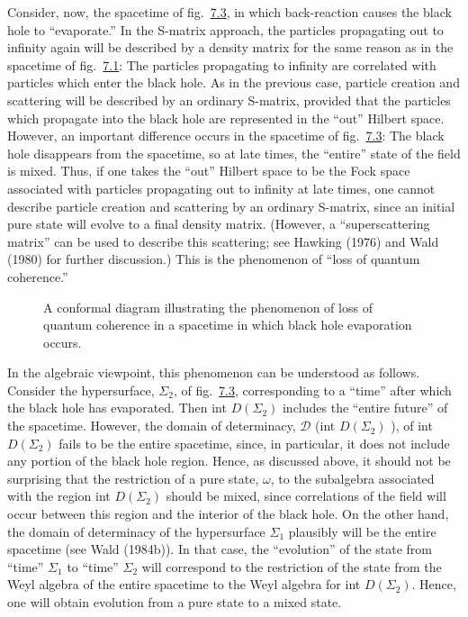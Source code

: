 \documentclass[11pt,a4paper]{article}
\begin{document}
Consider, now, the spacetime of fig.~\hyperref[fig:7.3]{7.3}, in which back-reaction causes the black hole to ``evaporate.'' In the S-matrix approach, the particles propagating out to infinity again will be described by a density matrix for the same reason as in the spacetime of fig.~\hyperref[fig:7.1]{7.1}: The particles propagating to infinity are correlated with particles which enter the black hole. As in the previous case, particle creation and scattering will be described by an ordinary S-matrix, provided that the particles which propagate into the black hole are represented in the ``out'' Hilbert space. However, an important difference occurs in the spacetime of fig.~\hyperref[fig:7.3]{7.3}: The black hole disappears from the spacetime, so at late times, the ``entire'' state of the field is mixed. Thus, if one takes the ``out'' \hypertarget{source-193}{} Hilbert space to be the Fock space associated with particles propagating out to infinity at late times, one cannot describe particle creation and scattering by an ordinary S-matrix, since an initial pure state will evolve to a final density matrix. (However, a ``superscattering matrix'' can be used to describe this scattering; see Hawking (1976) and Wald (1980) for further discussion.) This is the phenomenon of ``loss of quantum coherence.''

\begin{figure}[htbp]
\centering
\renewcommand{\thefigure}{7.3}

\caption{A conformal diagram illustrating the phenomenon of loss of quantum coherence in a spacetime in which black hole evaporation occurs.}\label{fig:7.3}
\end{figure}

In the algebraic viewpoint, this phenomenon can be understood as follows. Consider the hypersurface, \(\Sigma_2\), of fig.~\hyperref[fig:7.3]{7.3}, corresponding to a ``time'' after which the black hole has evaporated. Then int \(D(\Sigma_2)\) includes the ``entire future'' of the spacetime. However, the domain of determinacy, \(\mathcal{D}\) (int \(D(\Sigma_2)\) ), of int \(D(\Sigma_2)\) fails to be the entire spacetime, since, in particular, it does not include any portion of the black hole region. Hence, as discussed above, it should not be surprising that the restriction of a pure state, \(\omega\), to the subalgebra associated with the region int \(D(\Sigma_2)\) should be mixed, since correlations of the field will occur between this region and the interior of the black hole. On the other hand, the domain of determinacy of the hypersurface \(\Sigma_1\) plausibly will be the entire spacetime (see Wald \hypertarget{source-194}{} (1984b)). In that case, the ``evolution'' of the state from ``time'' \(\Sigma_1\) to ``time'' \(\Sigma_2\) will correspond to the restriction of the state from the Weyl algebra of the entire spacetime to the Weyl algebra for int \(D(\Sigma_2)\). Hence, one will obtain evolution from a pure state to a mixed state.
\end{document}
